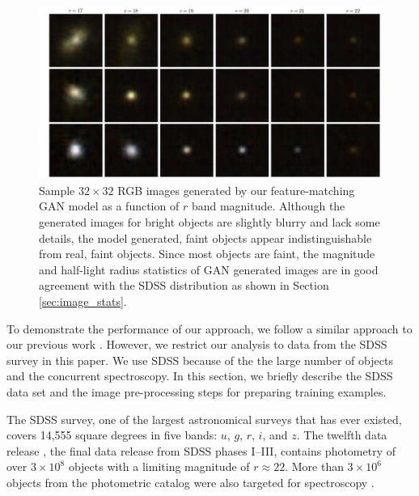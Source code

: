 \documentclass[fleqn,usenatbib]{mnras}
\begin{document}
\begin{figure}
  \centering
  \includegraphics[width=\linewidth]{figures/gan_stamps.pdf}
  \caption{
    Sample $32 \times 32$ RGB images generated by our feature-matching GAN model as a function of $r$ band magnitude.
    Although the generated images for bright objects are slightly blurry and lack some details,
    the model generated, faint objects appear indistinguishable from real, faint objects.
    Since most objects are faint, the magnitude and half-light radius statistics of GAN generated images are in good agreement
    with the SDSS distribution as shown in Section \ref{sec:image_stats}.
    }
  \label{fig:gan_stamps}
\end{figure}


  
To demonstrate the performance of our approach, we follow a similar approach to our previous 
work \citep{kim2017star}.
However, we restrict our analysis to data from the SDSS survey in this paper.
We use SDSS because of the the large number of objects and the concurrent spectroscopy.
In this section, we briefly describe the SDSS data set and the image pre-processing steps for
preparing training examples.

The SDSS survey, one of the largest astronomical surveys that has ever existed,
covers 14,555 square degrees in five bands: $u$, $g$, $r$, $i$, and $z$.
The twelfth data release \citep{alam2015eleventh}, the final data release from SDSS phases I--III,
contains photometry of over $3 \times 10^8$ objects with a limiting magnitude of $r \approx 22$.
More than $3 \times 10^6$ objects from the photometric catalog were also targeted for spectroscopy \citep{eisenstein2011sdss}.
\end{document}
